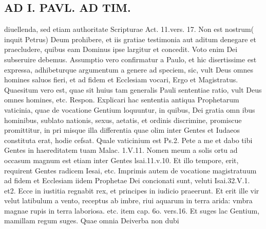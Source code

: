 \documentclass{article}
\begin{document}
\begin{pages}
\section*{AD I. PAVL. AD TIM. }
\marginpar{[ p.52 ]}\pstart diuellenda, sed etiam authoritate Scripturae Act. 11.vers. 17. Non est nostrum( inquit Petrus) Deum prohibere, et iis gratiae testimonia aut aditum denegare et praecludere, quibus eam Dominus ipse largitur et concedit. Voto enim Dei subseruire debemus. Assumptio vero confirmatur a Paulo, et hic disertissime est expressa, adhibeturque argumentum a genere ad speciem, sic, vult Deus omnes homines saluos fieri, et ad fidem et Ecclesiam vocari, Ergo et Magistratus. Quaesitum vero est, quae sit huius tam generalis Pauli sententiae ratio, vult Deus omnes homines, etc. Respon. Explicari hac sententia antiqua Prophetarum vaticinia, quae de vocatione Gentium loquuntur, in quibus, Dei gratia omn ibus hominibus, sublato nationis, sexus, aetatis, et ordinis discrimine, promiscue promittitur, in pri misque illa differentia quae olim inter Gentes et Iudaeos constituta erat, hodie cefsat. Quale vaticinium est Ps.2. Pete a me et dabo tibi Gentes in haereditatem tuam Malac. 1.V.11. Nomen meum a solis ortu ad occasum magnum est etiam inter Gentes lsai.11.v.10. Et illo tempore, erit, requirent Gentes radicem Iesai, etc. Imprimis autem de vocatione magistratuum ad fidem et Ecclesiam iidem Prophetae Dei concionati sunt, veluti Isai.32.V.1. et2. Ecce in iustitia regnabit rex, et principes in iudicio praeerunt. Et erit ille vir velut latibulum a vento, receptus ab imbre, riui aquarum in terra arida: vmbra magnae rupis in terra laboriosa. etc. item cap. 6o. vers.16. Et suges lac Gentium, mamillam regum suges. Quae omnia Deiverba non dubi\pend

\end{pages}
\end{document}
